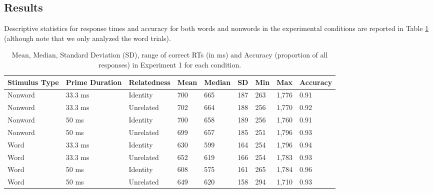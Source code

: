 \documentclass[
  english,
  man,floatsintext]{apa6}
\begin{document}
\hypertarget{results}{%
\subsection{Results}\label{results}}

Descriptive statistics for response times and accuracy for both words and nonwords in the experimental conditions are reported in Table \ref{tab:exp1-descriptive-rt-table} (although note that we only analyzed the word trials).



\begin{table}[tbp]

\begin{center}
\begin{threeparttable}

\caption{\label{tab:exp1-descriptive-rt-table}Mean, Median, Standard Deviation (SD), range of correct RTs (in ms) and Accuracy (proportion of all responses) in Experiment 1 for each condition.}

\begin{tabular}{lllllllll}
\toprule
Stimulus Type & \multicolumn{1}{c}{Prime Duration} & \multicolumn{1}{c}{Relatedness} & \multicolumn{1}{c}{Mean} & \multicolumn{1}{c}{Median} & \multicolumn{1}{c}{SD} & \multicolumn{1}{c}{Min} & \multicolumn{1}{c}{Max} & \multicolumn{1}{c}{Accuracy}\\
\midrule
Nonword & 33.3 ms & Identity & 700 & 665 & 187 & 263 & 1,776 & 0.91\\
Nonword & 33.3 ms & Unrelated & 702 & 664 & 188 & 256 & 1,770 & 0.92\\
Nonword & 50 ms & Identity & 700 & 658 & 189 & 256 & 1,760 & 0.91\\
Nonword & 50 ms & Unrelated & 699 & 657 & 185 & 251 & 1,796 & 0.93\\
Word & 33.3 ms & Identity & 630 & 599 & 164 & 254 & 1,796 & 0.94\\
Word & 33.3 ms & Unrelated & 652 & 619 & 166 & 254 & 1,783 & 0.93\\
Word & 50 ms & Identity & 608 & 575 & 161 & 265 & 1,784 & 0.96\\
Word & 50 ms & Unrelated & 649 & 620 & 158 & 294 & 1,710 & 0.93\\
\bottomrule
\end{tabular}

\end{threeparttable}
\end{center}

\end{table}
\end{document}
